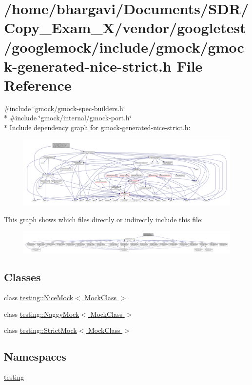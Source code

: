 \hypertarget{gmock-generated-nice-strict_8h}{}\section{/home/bhargavi/\+Documents/\+S\+D\+R/\+Copy\+\_\+\+Exam\+\_\+X/vendor/googletest/googlemock/include/gmock/gmock-\/generated-\/nice-\/strict.h File Reference}
\label{gmock-generated-nice-strict_8h}
{\ttfamily \#include \char`\"{}gmock/gmock-\/spec-\/builders.\+h\char`\"{}}\\*
{\ttfamily \#include \char`\"{}gmock/internal/gmock-\/port.\+h\char`\"{}}\\*
Include dependency graph for gmock-\/generated-\/nice-\/strict.h\+:
\nopagebreak
\begin{figure}[H]
\begin{center}
\leavevmode
\includegraphics[width=350pt]{gmock-generated-nice-strict_8h__incl}
\end{center}
\end{figure}
This graph shows which files directly or indirectly include this file\+:
\nopagebreak
\begin{figure}[H]
\begin{center}
\leavevmode
\includegraphics[width=350pt]{gmock-generated-nice-strict_8h__dep__incl}
\end{center}
\end{figure}
\subsection*{Classes}
\begin{DoxyCompactItemize}
\item 
class \hyperlink{classtesting_1_1_nice_mock}{testing\+::\+Nice\+Mock$<$ Mock\+Class $>$}
\item 
class \hyperlink{classtesting_1_1_naggy_mock}{testing\+::\+Naggy\+Mock$<$ Mock\+Class $>$}
\item 
class \hyperlink{classtesting_1_1_strict_mock}{testing\+::\+Strict\+Mock$<$ Mock\+Class $>$}
\end{DoxyCompactItemize}
\subsection*{Namespaces}
\begin{DoxyCompactItemize}
\item 
 \hyperlink{namespacetesting}{testing}
\end{DoxyCompactItemize}

